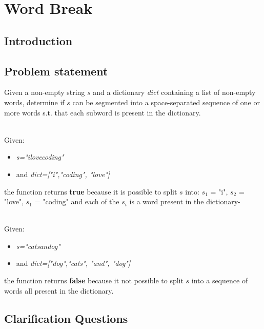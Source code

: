 %

\chapter{Word Break}
\label{ch:word_break}
\section*{Introduction}

\section{Problem statement}
\begin{exercise}
Given a non-empty string $s$ and a dictionary \textit{dict} containing a list of non-empty words, determine if $s$ can be segmented into a space-separated sequence of one or more words s.t. that each subword is present in the dictionary.

	\begin{example}
		\hfill \\
		Given:
		\begin{itemize}
			\item \textit{s="ilovecoding"}
			\item and \textit{dict=["i","coding", "love"]}
		\end{itemize}
		the function returns \textbf{true} because it is possible to split $s$
		into: $s_1$ = "i", $s_2$ = "love", $s_1$ = "coding" and each of the $s_i$ is a word present in the dictionary-
	\end{example}

	\begin{example}
		\hfill \\
		Given:
		\begin{itemize}
			\item \textit{s="catsandog"}
			\item and \textit{dict=["dog","cats", "and", "dog"]}
		\end{itemize}
		the function returns \textbf{false} because it not  possible to split $s$ into a sequence of words all present in the dictionary.
	\end{example}

\end{exercise}

\section{Clarification Questions}

